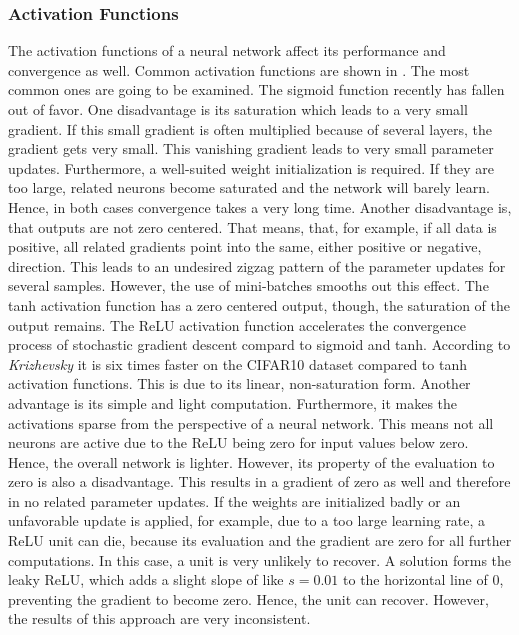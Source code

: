 \subsubsection{Activation Functions}
\label{sec:improving-performance-activation-functions}
The activation functions of a neural network affect its performance and convergence as well.
Common activation functions are shown in .
The most common ones are going to be examined.
The sigmoid function recently has fallen out of favor.
One disadvantage is its saturation which leads to a very small gradient.
If this small gradient is often multiplied because of several layers, the gradient gets very small.
This vanishing gradient leads to very small parameter updates.
Furthermore, a well-suited weight initialization is required.
If they are too large, related neurons become saturated and the network will barely learn.
Hence, in both cases convergence takes a very long time.
Another disadvantage is, that outputs are not zero centered.
That means, that, for example, if all data is positive, all related gradients point into the same, either positive or negative, direction.
This leads to an undesired zigzag pattern of the parameter updates for several samples.
However, the use of mini-batches smooths out this effect.
The tanh activation function has a zero centered output, though, the saturation of the output remains.
The ReLU activation function accelerates the convergence process of stochastic gradient descent compard to sigmoid and tanh.
According to \textit{Krizhevsky} it is six times faster on the CIFAR10 dataset compared to tanh activation functions\cite{Krizhevsky:2012:ICD:2999134.2999257}.
This is due to its linear, non-saturation form.
Another advantage is its simple and light computation.
Furthermore, it makes the activations sparse from the perspective of a neural network.
This means not all neurons are active due to the ReLU being zero for input values below zero.
Hence, the overall network is lighter.
However, its property of the evaluation to zero is also a disadvantage.
This results in a gradient of zero as well and therefore in no related parameter updates.
If the weights are initialized badly or an unfavorable update is applied, for example, due to a too large learning rate, a ReLU unit can die, because its evaluation and the gradient are zero for all further computations.
In this case, a unit is very unlikely to recover.
A solution forms the leaky ReLU, which adds a slight slope of like $s = 0.01$ to the horizontal line of 0, preventing the gradient to become zero.
Hence, the unit can recover.
However, the results of this approach are very inconsistent.

